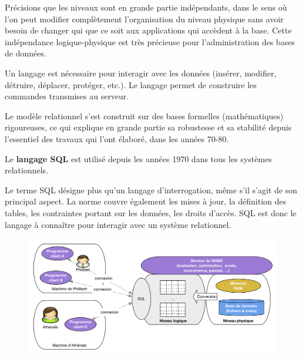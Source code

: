 \documentclass[
  a4paper,
  DIV=11,
  numbers=noendperiod]{scrartcl}
\begin{document}
Précisions que les niveaux sont en grande partie indépendants, dans le
sens où l'on peut modifier complètement l'organisation du niveau
physique sans avoir besoin de changer qui que ce soit aux applications
qui accèdent à la base. Cette indépendance logique-physique est très
précieuse pour l'administration des bases de données.

Un langage est nécessaire pour interagir avec les données (insérer,
modifier, détruire, déplacer, protéger, etc.). Le langage permet de
construire les commandes transmises au serveur.

Le modèle relationnel s'est construit sur des bases formelles
(mathématiques) rigoureuses, ce qui explique en grande partie sa
robustesse et sa stabilité depuis l'essentiel des travaux qui l'ont
élaboré, dans les années 70-80.

Le \textbf{langage SQL} est utilisé depuis les années 1970 dans tous les
systèmes relationnels.

Le terme SQL désigne plus qu'un langage d'interrogation, même s'il
s'agit de son principal aspect. La norme couvre également les mises à
jour, la définition des tables, les contraintes portant sur les données,
les droits d'accès. SQL est donc le langage à connaître pour interagir
avec un système relationnel.

\begin{figure}

{\centering \includegraphics{BDD4.png}

}

\end{figure}
\end{document}
